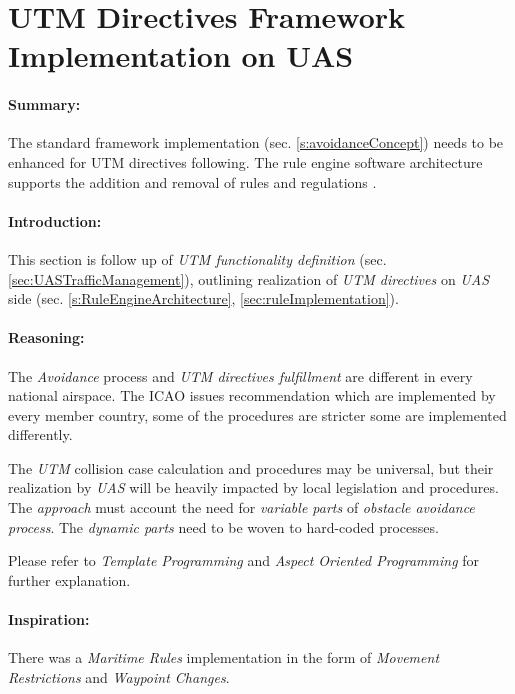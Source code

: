 \cleardoublepage
\section{UTM Directives Framework Implementation on UAS }\label{sec:ruleEngine}

\paragraph{Summary:} The standard framework implementation (sec. \ref{s:avoidanceConcept}) needs to be enhanced for UTM directives following. The rule engine software architecture supports the addition and removal of rules and regulations .

\paragraph{Introduction:} This section is follow up of \emph{UTM functionality definition} (sec. \ref{sec:UASTrafficManagement}), outlining realization of \emph{UTM directives} on \emph{UAS} side (sec. \ref{s:RuleEngineArchitecture},  \ref{sec:ruleImplementation}).

\paragraph{Reasoning:} The \emph{Avoidance} process and \emph{UTM directives fulfillment} are different in every national airspace. The ICAO issues recommendation \cite{icao4444,icaoAnnex2} which are implemented by every member country, some of the procedures are stricter some are implemented differently.

The \emph{UTM} collision case calculation and procedures may be universal, but their realization by \emph{UAS} will be heavily impacted by local legislation and procedures.  The \emph{approach} must account the need for \emph{variable parts} of \emph{obstacle avoidance process}. The \emph{dynamic parts} need to be woven to hard-coded processes. 

\begin{note}
	Please refer to \emph{Template Programming} and \emph{Aspect Oriented Programming} for further explanation.
\end{note}

\paragraph{Inspiration:} There was a \emph{Maritime Rules} implementation \cite{benjamin2006navigation} in the form of \emph{Movement Restrictions} and \emph{Waypoint Changes}.
